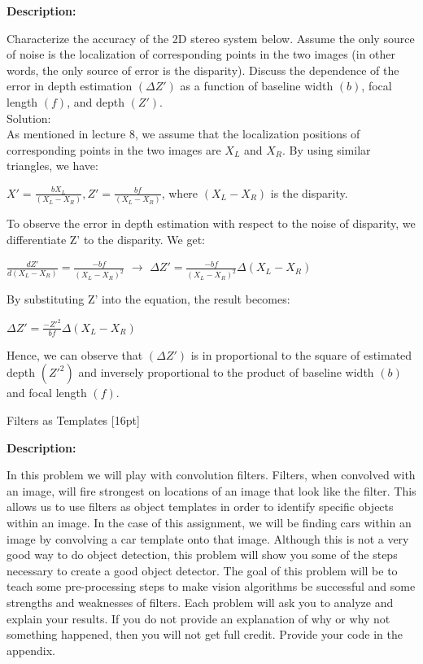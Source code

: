 \documentclass{assignment}
\begin{document}
\begin{problemlist}
\textbf{Description:}

Characterize the accuracy of the 2D stereo system below. Assume the only source of noise is the localization of corresponding points in the two images (in other words, the only source of error is the disparity). Discuss the dependence of the error in depth estimation $(\Delta Z')$ as a function of baseline width $(b)$, focal length $(f)$, and depth $(Z')$.\\
Solution:\\
As mentioned in lecture 8, we assume that the localization positions of corresponding points in the two images are $X_L$ and $X_R$. By using similar triangles, we have:\\
\begin{center}
$X' = \frac{bX_L}{(X_L-X_R)}, Z' =  \frac{bf}{(X_L-X_R)}$, where $(X_L-X_R)$ is the disparity.\\
\end{center}
To observe the error in depth estimation with respect to the noise of disparity, we differentiate Z' to the disparity. We get:\\
\begin{center}
$\frac{dZ'}{d(X_L-X_R)} = \frac{-bf}{(X_L-X_R)^2}$ $\to$ $\Delta Z' = \frac{-bf}{(X_L-X_R)^2} \Delta(X_L-X_R)$\\
\end{center}
By substituting Z' into the equation, the result becomes:\\
\begin{center}
$\Delta Z' = \frac{-Z'^2}{bf} \Delta(X_L-X_R)$\\
\end{center}
Hence, we can observe that $(\Delta Z')$ is in proportional to the square of estimated depth $(Z'^2)$ and inversely proportional to the product of baseline width $(b)$ and focal length $(f)$.




\newpage
\pbitem Filters as Templates [16pt]

\textbf{Description:}

In this problem we will play with convolution filters. Filters, when convolved with an image, will fire strongest on locations of an image that look like the filter. This allows us to use filters as object templates in order to identify specific objects within an image. In the case of this assignment, we will be finding cars within an image by convolving a car template onto that image. Although this is not a very good way to do object detection, this problem will show you some of the steps necessary to create a good object detector. The goal of this problem will be to teach some pre-processing steps to make vision algorithms be successful and some strengths and weaknesses of filters. Each problem will ask you to analyze and explain your results. If you do not provide an explanation of why or why not something happened, then you will not get full credit. Provide your code in the appendix.\\


\end{problemlist}
\end{document}
